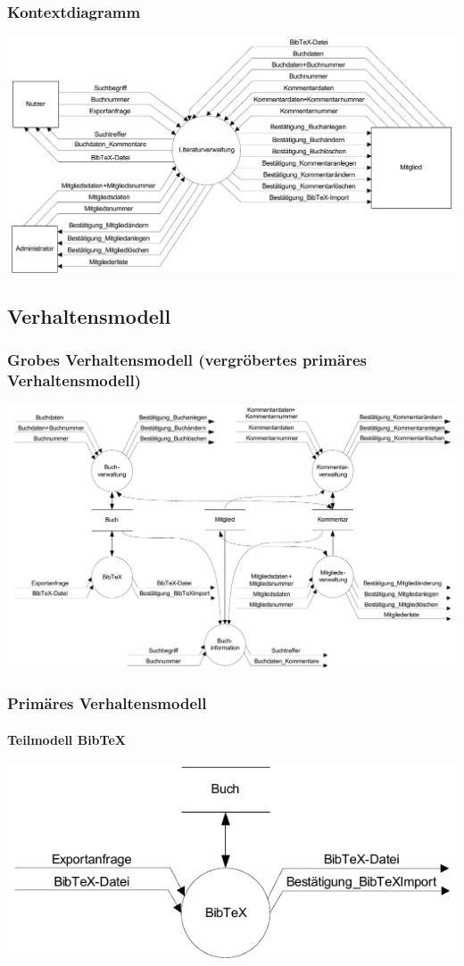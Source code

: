 \subsubsection{Kontextdiagramm}

\includegraphics[scale=0.75]{kontextdiagramm}

\subsection{Verhaltensmodell}
\subsubsection{Grobes Verhaltensmodell (vergröbertes primäres Verhaltensmodell)}
\includegraphics[scale=0.70]{grobes_verhaltensmodell}

\subsubsection{Primäres Verhaltensmodell}
\paragraph{Teilmodell BibTeX}
\includegraphics[scale=1.0]{teilmodell_bibtex}


